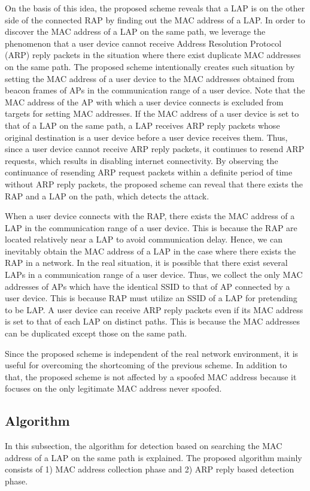 \documentclass[conference]{IEEEtran}
\begin{document}
On the basis of this idea, the proposed scheme reveals that a LAP is on the other side of the connected RAP by finding out the MAC address of a LAP.
In order to discover the MAC address of a LAP on the same path, we leverage the phenomenon that a user device cannot receive Address Resolution Protocol (ARP) reply packets in the situation where there exist duplicate MAC addresses on the same path.
The proposed scheme intentionally creates such situation by setting the MAC address of a user device to the MAC addresses obtained from beacon frames of APs in the communication range of a user device.
Note that the MAC address of the AP with which a user device connects is excluded from targets for setting MAC addresses.
If the MAC address of a user device is set to that of a LAP on the same path, a LAP receives ARP reply packets whose original destination is a user device before a user device receives them.
Thus, since a user device cannot receive ARP reply packets, it continues to resend ARP requests, which results in disabling internet connectivity.
By observing the continuance of resending ARP request packets within a definite period of time without ARP reply packets, the proposed scheme can reveal that there exists the RAP and a LAP on the path, which detects the attack.

When a user device connects with the RAP, there exists the MAC address of a LAP in the communication range of a user device.
This is because the RAP are located relatively near a LAP to avoid communication delay.
Hence, we can inevitably obtain the MAC address of a LAP in the case where there exists the RAP in a network.
In the real situation, it is possible that there exist several LAPs in a communication range of a user device.
Thus, we collect the only MAC addresses of APs which have the identical SSID to that of AP connected by a user device.
This is because RAP must utilize an SSID of a LAP for pretending to be LAP.
A user device can receive ARP reply packets even if its MAC address is set to that of each LAP on distinct paths.
This is because the MAC addresses can be duplicated except those on the same path.

Since the proposed scheme is independent of the real network environment, it is useful for overcoming the shortcoming of the previous scheme.
In addition to that, the proposed scheme is not affected by a spoofed MAC address because it focuses on the only legitimate MAC address never spoofed.

\subsection{Algorithm}
In this subsection, the algorithm for detection based on searching the MAC address of a LAP on the same path is explained.
The proposed algorithm mainly consists of 1) MAC address collection phase and 2) ARP reply based detection phase. 
\end{document}
